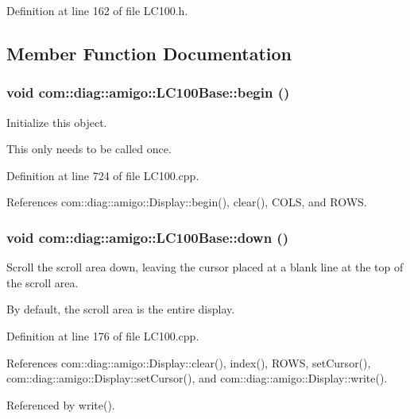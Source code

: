 Definition at line 162 of file LC100.h.



\subsection{Member Function Documentation}
\hypertarget{classcom_1_1diag_1_1amigo_1_1LC100Base_a3cf988ae645ac743c6b5cafa2748e30b}{
\subsubsection[{begin}]{\setlength{\rightskip}{0pt plus 5cm}void com::diag::amigo::LC100Base::begin ()}}
\label{classcom_1_1diag_1_1amigo_1_1LC100Base_a3cf988ae645ac743c6b5cafa2748e30b}


Initialize this object. 

This only needs to be called once. 

Definition at line 724 of file LC100.cpp.



References com::diag::amigo::Display::begin(), clear(), COLS, and ROWS.

\hypertarget{classcom_1_1diag_1_1amigo_1_1LC100Base_af532b82f424d25c8a7b014f16a463abb}{
\subsubsection[{down}]{\setlength{\rightskip}{0pt plus 5cm}void com::diag::amigo::LC100Base::down ()}}
\label{classcom_1_1diag_1_1amigo_1_1LC100Base_af532b82f424d25c8a7b014f16a463abb}


Scroll the scroll area down, leaving the cursor placed at a blank line at the top of the scroll area. 

By default, the scroll area is the entire display. 

Definition at line 176 of file LC100.cpp.



References com::diag::amigo::Display::clear(), index(), ROWS, setCursor(), com::diag::amigo::Display::setCursor(), and com::diag::amigo::Display::write().



Referenced by write().

